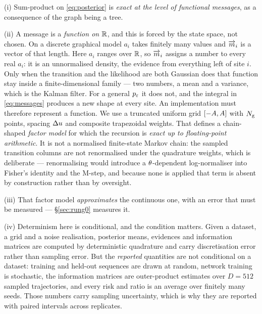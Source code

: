 (i) Sum-product on \eqref{eq:posterior} is \emph{exact at the level of functional messages}, as a
consequence of the graph being a tree.

(ii) A message is a \emph{function on $\mathbb{R}$}, and this is forced by the state space, not chosen.
On a discrete graphical model $a_i$ takes finitely many values and $\overrightarrow{m}_i$ is a vector of that
length. Here $a_i$ ranges over $\mathbb{R}$, so $\overrightarrow{m}_i$ assigns a number to every real $a_i$: it is
an unnormalised density, the evidence from everything left of site $i$. Only when the transition
and the likelihood are both Gaussian does that function stay inside a finite-dimensional family
--- two numbers, a mean and a variance, which is the Kalman filter. For a general $p_{\varepsilon}$ it does
not, and the integral in \eqref{eq:messages} produces a new shape at every site. An implementation
must therefore represent a function. We use a truncated uniform grid
$[-A,A]$ with $N_{\mathrm{g}}$ points, spacing $\Delta u$ and composite trapezoidal
weights. That defines a chain-shaped \emph{factor model} for which the recursion is \emph{exact
up to floating-point arithmetic}. It is not a normalised finite-state Markov chain: the sampled
transition columns are not renormalised under the quadrature weights, which is deliberate ---
renormalising would introduce a $\theta$-dependent log-normaliser into Fisher's identity and the
M-step, and because none is applied that term is absent by construction rather than by oversight.

(iii) That factor model \emph{approximates} the continuous one, with an error that must be
measured --- \S\ref{sec:rung0} measures it.

(iv) Determinism here is conditional, and the condition matters. Given a dataset, a grid and a
noise realisation, posterior means, evidences and information matrices are computed by
deterministic quadrature and carry discretisation error rather than sampling error. But the
\emph{reported} quantities are not conditional on a dataset: training and held-out sequences are
drawn at random, network training is stochastic, the information matrices are outer-product
estimates over $D=512$ sampled trajectories, and every risk and ratio is an average over finitely
many seeds. Those numbers carry sampling uncertainty, which is why they are reported with paired
intervals across replicates.

